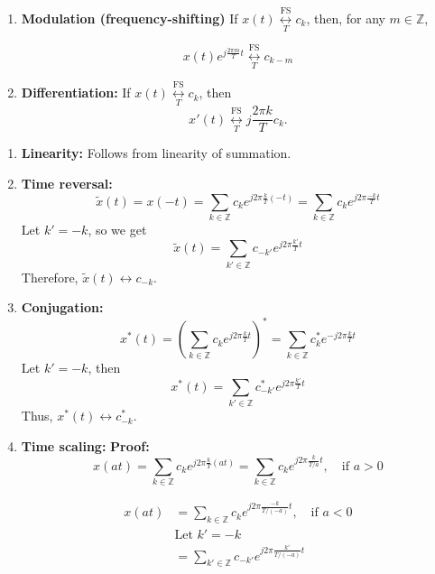 \begin{definition}
\begin{enumerate}
        \item \textbf{Modulation (frequency-shifting)} If $x(t) \underset{T}{\overset{\text{FS}}{\longleftrightarrow}} c_k$, then, for any \( m \in \mathbb{Z} \),
        
        \[
        x(t)e^{j\frac{2\pi m}{T}t} \underset{T}{\overset{\text{FS}}{\longleftrightarrow}} c_{k-m}
        \]        
        \item \textbf{Differentiation:} If $x(t) \underset{T}{\overset{\text{FS}}{\longleftrightarrow}} c_k$, then
        \[
        x'(t) \underset{T}{\overset{\text{FS}}{\longleftrightarrow}} j\frac{2\pi k}{T} c_k.
        \]
    \end{enumerate}     
\end{definition}

\begin{derivation}
    \begin{enumerate}
        \item \textbf{Linearity:} Follows from linearity of summation.
        \item \textbf{Time reversal:} 
        \[
        \tilde{x}(t) = x(-t) = \sum_{k \in \mathbb{Z}} c_k e^{j 2\pi \frac{k}{T} (-t)} = \sum_{k \in \mathbb{Z}} c_k e^{j 2\pi \frac{-k}{T} t}
        \]
        Let \( k' = -k \), so we get
        \[
        \tilde{x}(t) = \sum_{k' \in \mathbb{Z}} c_{-k'} e^{j 2\pi \frac{k'}{T} t}
        \]
        Therefore, \( \tilde{x}(t) \longleftrightarrow c_{-k} \).

        \item \textbf{Conjugation:} 
        \[
            x^*(t) = \left( \sum_{k \in \mathbb{Z}} c_k e^{j 2\pi \frac{k}{T} t} \right)^* = \sum_{k \in \mathbb{Z}} c_k^* e^{-j 2\pi \frac{k}{T} t}
            \]
            Let \( k' = -k \), then 
            \[
            x^*(t) = \sum_{k' \in \mathbb{Z}} c_{-k'}^* e^{j 2\pi \frac{k'}{T} t}
            \]
            Thus, \( x^*(t) \longleftrightarrow c_{-k}^* \).
        \item \textbf{Time scaling:}
        \textbf{Proof:} 
        \[
        x(at) = \sum_{k \in \mathbb{Z}} c_k e^{j 2\pi \frac{k}{T} (at)} = \sum_{k \in \mathbb{Z}} c_k e^{j 2\pi \frac{k}{T/a} t}, \quad \text{if } a > 0
        \]
        \vspace{1em}

        \begin{align*}
            x(at) &= \sum_{k \in \mathbb{Z}} c_k e^{j 2\pi \frac{-k}{T/(-a)} t}, \quad \text{if } a < 0 \\
            &\text{Let $k' = -k$} \\ 
            &= \sum_{k'\in \mathbb{Z}} c_{-k'} e^{j 2\pi \frac{k'}{T/(-a)} t}
        \end{align*}


\end{enumerate}
\end{derivation}
